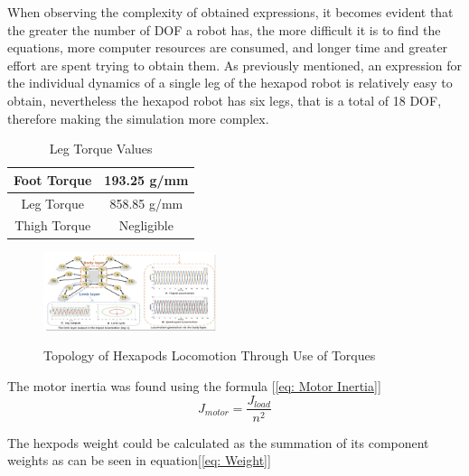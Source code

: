 When observing the complexity of obtained expressions, it becomes evident that the greater the number of DOF a robot has, the more difficult it is to find the equations, more computer resources are consumed, and longer time and greater effort are spent trying to obtain them. As previously mentioned, an expression for the individual dynamics of a single leg of the hexapod robot is relatively easy to obtain, nevertheless the hexapod robot has six legs, that is a total of 18 DOF, therefore making the simulation more complex.\\




\begin{table}[htbp]
	\caption{Leg Torque Values}
	\begin{center}
		\begin{tabular}{|c|c|}
			\hline  
			Foot Torque & 193.25 g/mm \\
			\hline
			Leg Torque & 858.85 g/mm\\
			\hline
			Thigh Torque & Negligible \\
			\hline
		\end{tabular}
		\end{center}
	\label{tab3}
	
\end{table}






\begin{figure}[h]
 \centering
   \includegraphics[width = 0.45\textwidth]{figures/13.png}                            
   \caption{Topology of Hexapods Locomotion Through Use of Torques}
   \cite{10.3389/fnbot.2021.627157}
   \label{fig: Diagram 5}
\end{figure}




The motor inertia was found using the formula  [\ref{eq: Motor Inertia}]
\begin{equation} \label{eq: Motor Inertia}
	J_{motor} = \frac{J_{load}}{n^2}
\end{equation}

	


 

The hexpods weight could be calculated as the summation of its component weights as can be seen in equation[\ref{eq: Weight}]

